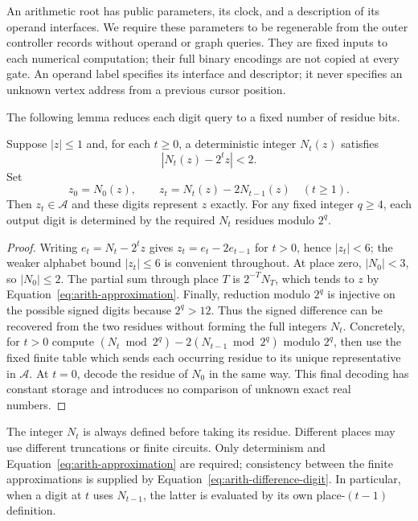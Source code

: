 An arithmetic root has public parameters, its clock, and a description
of its operand interfaces.  We require these parameters to be
regenerable from the outer controller records without operand or graph
queries.  They are fixed inputs to each numerical computation; their
full binary encodings are not copied at every gate.  An operand label
specifies its interface and descriptor; it never specifies an unknown
vertex address from a previous cursor position.

The following lemma reduces each digit query to a fixed number of
residue bits.

\begin{lemma}
\label{lem:arith-residue-stream}
Suppose $|z|\leq1$ and, for each $t\geq0$, a deterministic integer
$N_t(z)$ satisfies
\begin{equation}
 |N_t(z)-2^tz|<2.
 \label{eq:arith-approximation}
\end{equation}
Set
\begin{equation}
 z_0=N_0(z),\qquad z_t=N_t(z)-2N_{t-1}(z)\quad(t\geq1).
 \label{eq:arith-difference-digit}
\end{equation}
Then $z_t\in\mathcal A$ and these digits represent $z$ exactly.
For any fixed integer $q\geq4$, each output digit is determined by
the required $N_t$ residues modulo $2^q$.
\end{lemma}

\begin{proof}
Writing $e_t=N_t-2^tz$ gives
$z_t=e_t-2e_{t-1}$ for $t>0$, hence $|z_t|<6$; the weaker alphabet
bound $|z_t|\leq6$ is convenient throughout.  At place zero,
$|N_0|<3$, so $|N_0|\leq2$.  The partial sum through place $T$ is
$2^{-T}N_T$, which tends to $z$ by Equation~\eqref{eq:arith-approximation}.
Finally, reduction modulo $2^q$ is injective on the possible signed
digits because $2^q>12$.  Thus the signed difference can be recovered
from the two residues without forming the full integers $N_t$.
Concretely, for $t>0$ compute
$(N_t\bmod 2^q)-2(N_{t-1}\bmod 2^q)$ modulo $2^q$, then use the
fixed finite table which sends each occurring residue to its unique
representative in $\mathcal A$.  At $t=0$, decode the residue of
$N_0$ in the same way.  This final decoding has constant storage and
introduces no comparison of unknown exact real numbers.
\end{proof}

The integer $N_t$ is always defined before taking its residue.
Different places may use different truncations or finite circuits.
Only determinism and Equation~\eqref{eq:arith-approximation} are
required; consistency between the finite approximations is supplied
by Equation~\eqref{eq:arith-difference-digit}.  In particular, when a
digit at $t$ uses $N_{t-1}$, the latter is evaluated by its own
place-$(t-1)$ definition.

